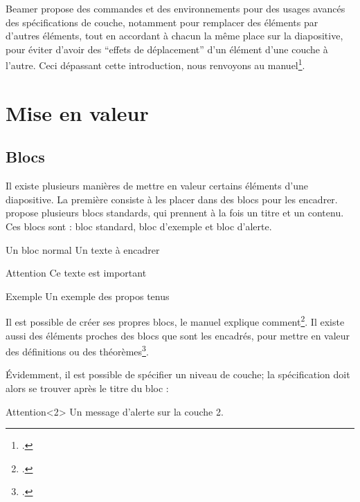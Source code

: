 Beamer propose des commandes et des environnements pour des usages avancés des spécifications de couche, notamment pour remplacer des éléments par d'autres éléments, tout en accordant à chacun la même place sur la diapositive, pour éviter d'avoir des \enquote{effets de déplacement} d'un élément d'une couche à l'autre. 
Ceci dépassant cette introduction, nous renvoyons au manuel\footcite{beamer_overlays}.
\section{Mise en valeur}

\subsection{Blocs}

Il existe plusieurs manières de mettre en valeur certains éléments d'une diapositive. La première  consiste à les placer dans des blocs pour les encadrer.  propose plusieurs blocs standards, qui prennent à la fois un titre et un contenu. Ces blocs sont  : bloc standard, bloc d'exemple et bloc d'alerte.

\begin{latexcode}
\begin{block}{Un bloc normal} 
    Un texte à encadrer
\end{block}
\begin{alertblock}{Attention} 
    Ce texte est important
\end{alertblock}
\begin{exampleblock}{Exemple} 
    Un exemple des propos tenus
\end{exampleblock}
\end{latexcode}

\begin{plusloins}
Il est possible de créer ses propres blocs, le manuel explique comment\footcite{beamer_box}. Il existe aussi des éléments proches des blocs que sont les encadrés, pour mettre en valeur des définitions ou des théorèmes\footcite{beamer_theorems}.
\end{plusloins}

Évidemment, il est possible de spécifier un niveau de couche; la spécification doit alors se trouver après le titre du bloc :

\begin{latexcode}
\begin{alertblock}{Attention}<2>
    Un message d'alerte sur la couche 2.
\end{alertblock}
\end{latexcode}

